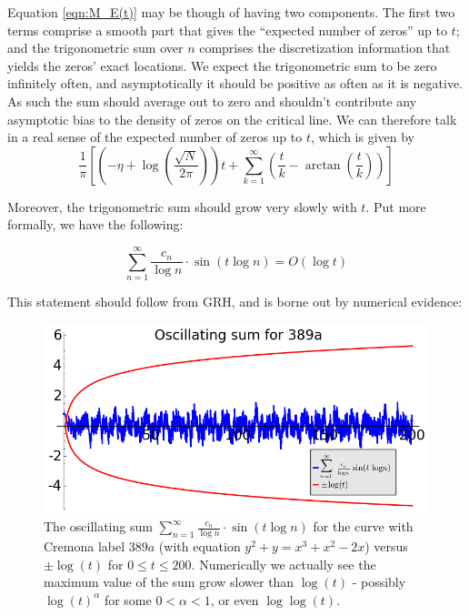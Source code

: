 Equation \ref{eqn:M_E(t)} may be though of having two components. The first two terms comprise a smooth part that gives the ``expected number of zeros'' up to $t$; and the trigonometric sum over $n$ comprises the discretization information that yields the zeros' exact locations. We expect the trigonometric sum to be zero infinitely often, and asymptotically it should be positive as often as it is negative. As such the sum should average out to zero and shouldn't contribute any asymptotic bias to the density of zeros on the critical line. We can therefore talk in a real sense of the expected number of zeros up to $t$, which is given by
\begin{equation}\label{eqn:M_E_smooth_part}
\frac{1}{\pi}\left[\left(-\eta+\log\left(\frac{\sqrt{N}}{2\pi}\right)\right) t + \sum_{k=1}^{\infty} \left(\frac{t}{k} - \arctan\left(\frac{t}{k}\right)\right)\right]
\end{equation}

Moreover, the trigonometric sum should grow very slowly with $t$. Put more formally, we have the following:
\begin{conjecture}\label{conj:trig_sum_size}
\begin{equation}
\sum_{n=1}^{\infty} \frac{c_n}{\log n}\cdot \sin(t\log n) = O(\log t)
\end{equation}
\end{conjecture}
This statement should follow from GRH, and is borne out by numerical evidence:

\begin{figure}[!h]
    \centering
    \includegraphics[width=1.0\textwidth]{graphics/M_E_trig_sum_bounds.png}
    \caption{The oscillating sum $\sum_{n=1}^{\infty} \frac{c_n}{\log n}\cdot \sin(t\log n)$ for the curve with Cremona label $389a$ (with equation $y^2 + y = x^3 + x^2 - 2x$) versus $\pm \log(t)$ for $0\le t \le 200$. Numerically we actually see the maximum value of the sum grow slower than $\log(t)$ - possibly $\log(t)^{\alpha}$ for some $0<\alpha<1$, or even $\log\log(t)$.}
    \label{fig:M_E_trig_sum_bounds}
\end{figure}

